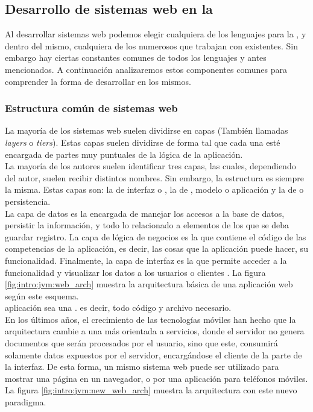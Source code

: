 \subsection{Desarrollo de sistemas web en la \jvm}
\label{subsec:intro:jvm_dev}

Al desarrollar sistemas web podemos elegir cualquiera de los lenguajes para
la \jvm, y dentro del mismo, cualquiera de los numerosos \frameworks que trabajan
con \htmlv existentes. Sin embargo hay ciertas constantes comunes de todos los
lenguajes y \frameworks antes mencionados. A continuación analizaremos estos
componentes comunes para comprender la forma de desarrollar en los mismos.

\subsubsection{Estructura común de sistemas web}
\label{susubbsec:intro:jvm_dev:structure}

La mayoría de los sistemas web suelen dividirse en capas (También llamadas
\emph{layers} o \emph{tiers}). Estas capas suelen dividirse de forma tal que
cada una esté encargada de partes muy puntuales de la lógica de la aplicación.\\
La mayoría de los autores  suelen identificar tres capas, las cuales, dependiendo
del autor, suelen recibir distintos nombres. Sin embargo, la estructura es siempre
la misma. Estas capas son: la de interfaz o \view, la de \logic,
modelo o aplicación y la de \data o persistencia.\\
La capa de datos es la encargada de manejar los accesos a la base de datos, persistir
la información, y todo lo relacionado a elementos de los que se deba guardar registro.
La capa de lógica de negocios es la que contiene el código de las competencias de la
aplicación, es decir, las cosas que la aplicación puede hacer, su funcionalidad.
Finalmente, la capa de interfaz es la que permite acceder a la funcionalidad y visualizar
los datos a los usuarios o clientes .
La figura \ref{fig:intro:jvm:web_arch} muestra la arquitectura básica de una aplicación
web según este esquema.\\
aplicación sea una \ria. es decir, todo código \js y archivo \css necesario.\\
En los últimos años, el crecimiento de las tecnologías móviles han hecho que la
arquitectura cambie a una más orientada a servicios, donde el servidor no genera
documentos que serán procesados por el usuario, sino que este, consumirá solamente
datos expuestos por el servidor, encargándose el cliente de la parte de la interfaz.
De esta forma, un mismo sistema web puede ser utilizado para mostrar una página en un
navegador, o por una aplicación para teléfonos móviles.
La figura \ref{fig:intro:jvm:new_web_arch} muestra la arquitectura con este nuevo
paradigma.

